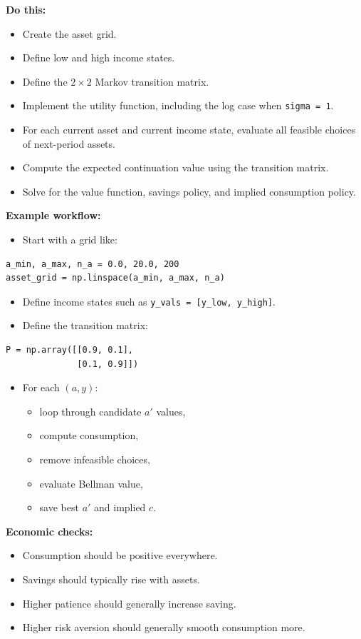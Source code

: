 \documentclass[11pt]{article}
\begin{document}
\textbf{Do this:}
\begin{itemize}
    \item Create the asset grid.
    \item Define low and high income states.
    \item Define the \(2 \times 2\) Markov transition matrix.
    \item Implement the utility function, including the log case when \verb|sigma = 1|.
    \item For each current asset and current income state, evaluate all feasible choices of next-period assets.
    \item Compute the expected continuation value using the transition matrix.
    \item Solve for the value function, savings policy, and implied consumption policy.
\end{itemize}

\textbf{Example workflow:}
\begin{itemize}
    \item Start with a grid like:
\end{itemize}
\begin{lstlisting}
a_min, a_max, n_a = 0.0, 20.0, 200
asset_grid = np.linspace(a_min, a_max, n_a)
\end{lstlisting}
\begin{itemize}
    \item Define income states such as \verb|y_vals = [y_low, y_high]|.
    \item Define the transition matrix:
\end{itemize}
\begin{lstlisting}
P = np.array([[0.9, 0.1],
              [0.1, 0.9]])
\end{lstlisting}
\begin{itemize}
    \item For each \((a, y)\):
    \begin{itemize}
        \item loop through candidate \(a'\) values,
        \item compute consumption,
        \item remove infeasible choices,
        \item evaluate Bellman value,
        \item save best \(a'\) and implied \(c\).
    \end{itemize}
\end{itemize}

\textbf{Economic checks:}
\begin{itemize}
    \item Consumption should be positive everywhere.
    \item Savings should typically rise with assets.
    \item Higher patience should generally increase saving.
    \item Higher risk aversion should generally smooth consumption more.
\end{itemize}
\end{document}
